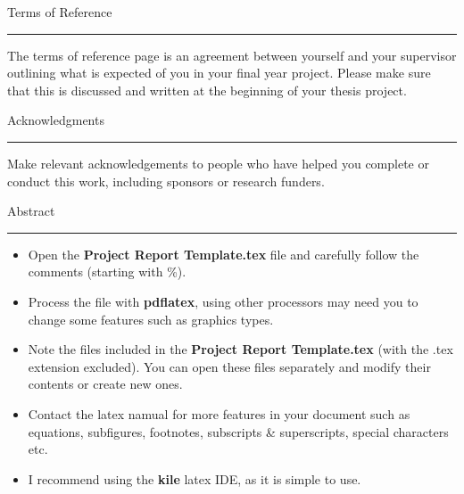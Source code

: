 \documentclass[a4paper,12pt]{report}
\begin{document}
{\newpage
    {\Large Terms of Reference}\\
    \hrule
    The terms of reference page is an agreement between yourself and your supervisor outlining what is expected of you in your final year project. Please make sure that this is discussed and written at the beginning of your thesis project. 


\newpage
{\Large Acknowledgments}\\
\hrule
Make relevant acknowledgements to people who have helped you complete or conduct this work, including sponsors or research funders.


\newpage
    {\Large Abstract}\\
    \hrule

    \begin{itemize}
        \item Open the {\bf Project Report Template.tex} file and carefully follow the comments (starting with \%).
        \item Process the file with {\bf pdflatex}, using other processors may need you to change some features such as graphics types.
        \item Note the files included in the  {\bf Project Report Template.tex} (with the .tex extension excluded). You can open these files separately and modify their contents 
        or create new ones.
        \item Contact the latex namual for more features in your document such as equations, subfigures, footnotes, subscripts \& superscripts, special characters etc.
        \item I recommend using the {\bf kile} latex IDE, as it is simple to use.
    \end{itemize}


\newpage
    \tableofcontents



\newpage
\fancyhead[RE,LO]{}
\fancyhead[LE]{\leftmark}
\fancyhead[RO]{\rightmark}
\pagestyle{fancy}










\appendix


}
\end{document}
